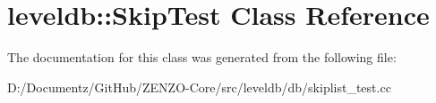 \hypertarget{classleveldb_1_1_skip_test}{}\section{leveldb\+::Skip\+Test Class Reference}
\label{classleveldb_1_1_skip_test}


The documentation for this class was generated from the following file\+:\begin{DoxyCompactItemize}
\item 
D\+:/\+Documentz/\+Git\+Hub/\+Z\+E\+N\+Z\+O-\/\+Core/src/leveldb/db/skiplist\+\_\+test.\+cc\end{DoxyCompactItemize}
